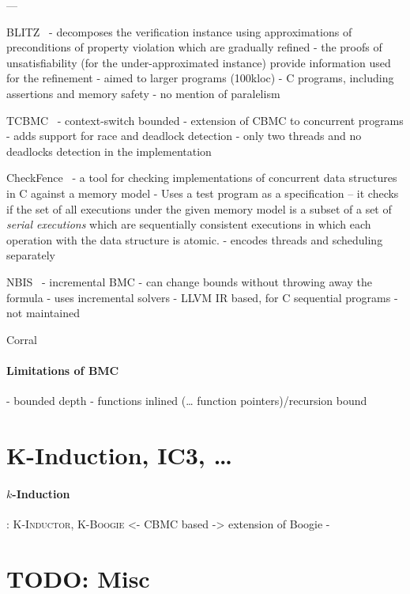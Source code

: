 

---

BLITZ~\cite{Cho2013}
- decomposes the verification instance using approximations of preconditions of property violation which are gradually refined
- the proofs of unsatisfiability (for the under-approximated instance) provide information used for the refinement
- aimed to larger programs (100kloc)
- C programs, including assertions and memory safety
- no mention of paralelism

TCBMC~\cite{Rabinovitz2005}
- context-switch bounded
- extension of CBMC to concurrent programs
- adds support for race and deadlock detection
- only two threads and no deadlocks detection in the implementation

CheckFence~\cite{Burckhardt2007}
- a tool for checking implementations of concurrent data structures in C against a memory model
- Uses a test program as a specification -- it checks if the set of all executions under the given memory model is a subset of a set of \emph{serial executions} which are sequentially consistent executions in which each operation with the data structure is atomic.
- encodes threads and scheduling separately


NBIS~\cite{Gunther2016}
- incremental BMC - can change bounds without throwing away the formula
- uses incremental solvers
- LLVM IR based, for C sequential programs
- not maintained

Corral

\paragraph{Limitations of BMC}

- bounded depth
- functions inlined (… function pointers)/recursion bound

\section{K-Induction, IC3, …}

\paragraph{$k$-Induction}


\cite{Donaldson2011}: \textsc{K-Inductor}, \textsc{K-Boogie}
<- CBMC based
-> extension of Boogie
- 

\section{TODO: Misc}

